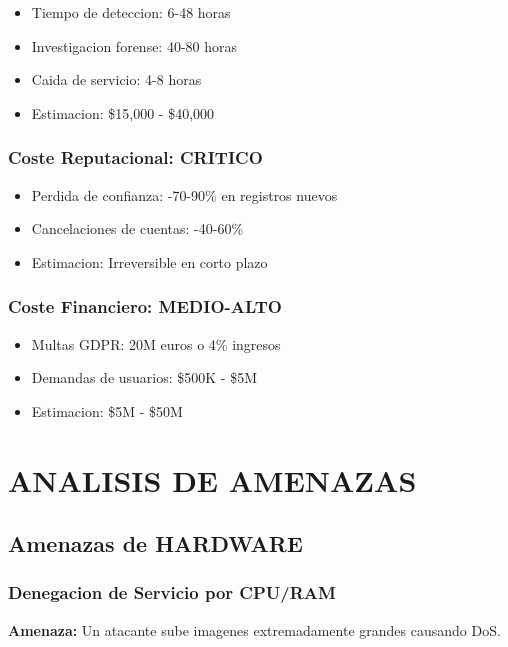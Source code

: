 \documentclass[12pt,a4paper]{article}
\begin{document}
\begin{itemize}
    \item Tiempo de deteccion: 6-48 horas
    \item Investigacion forense: 40-80 horas
    \item Caida de servicio: 4-8 horas
    \item Estimacion: \$15,000 - \$40,000
\end{itemize}

\subsubsection{Coste Reputacional: CRITICO}

\begin{itemize}
    \item Perdida de confianza: -70-90\% en registros nuevos
    \item Cancelaciones de cuentas: -40-60\%
    \item Estimacion: Irreversible en corto plazo
\end{itemize}

\subsubsection{Coste Financiero: MEDIO-ALTO}

\begin{itemize}
    \item Multas GDPR: 20M euros o 4\% ingresos
    \item Demandas de usuarios: \$500K - \$5M
    \item Estimacion: \$5M - \$50M
\end{itemize}

\section{ANALISIS DE AMENAZAS}

\subsection{Amenazas de HARDWARE}

\subsubsection{Denegacion de Servicio por CPU/RAM}

\textbf{Amenaza:} Un atacante sube imagenes extremadamente grandes causando DoS.
\end{document}
